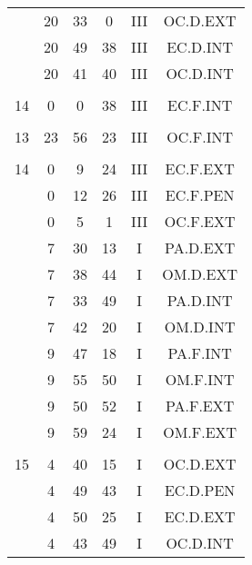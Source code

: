 \documentclass[12pt, a4paper]{article}
\begin{document}
\begin{multicols}{3}
{\begin{tabular}{c c c c c c}
	 	 	 	 & 20 & 33 & 0 & III & OC.D.EXT\\%
	 	 	 	 & 20 & 49 & 38 & III & EC.D.INT\\%
	 	 	 	 & 20 & 41 & 40 & III & OC.D.INT\\%
	 	 	 	 & & & & & \\%
	 	 	 	14 & 0 & 0 & 38 & III & EC.F.INT\\%
	 	 	 	 & & & & & \\%
	 	 	 	13 & 23 & 56 & 23 & III & OC.F.INT\\%
	 	 	 	 & & & & & \\%
	 	 	 	14 & 0 & 9 & 24 & III & EC.F.EXT\\%
	 	 	 	 & 0 & 12 & 26 & III & EC.F.PEN\\%
	 	 	 	 & 0 & 5 & 1 & III & OC.F.EXT\\%
	 	 	 	 & 7 & 30 & 13 & I & PA.D.EXT\\%
	 	 	 	 & 7 & 38 & 44 & I & OM.D.EXT\\%
	 	 	 	 & 7 & 33 & 49 & I & PA.D.INT\\%
	 	 	 	 & 7 & 42 & 20 & I & OM.D.INT\\%
	 	 	 	 & 9 & 47 & 18 & I & PA.F.INT\\%
	 	 	 	 & 9 & 55 & 50 & I & OM.F.INT\\%
	 	 	 	 & 9 & 50 & 52 & I & PA.F.EXT\\%
	 	 	 	 & 9 & 59 & 24 & I & OM.F.EXT\\%
	 	 	 	 & & & & & \\%
	 	 	 	15 & 4 & 40 & 15 & I & OC.D.EXT\\%
	 	 	 	 & 4 & 49 & 43 & I & EC.D.PEN\\%
	 	 	 	 & 4 & 50 & 25 & I & EC.D.EXT\\%
	 	 	 	 & 4 & 43 & 49 & I & OC.D.INT\\%

\end{tabular}}
\end{multicols}
\end{document}
